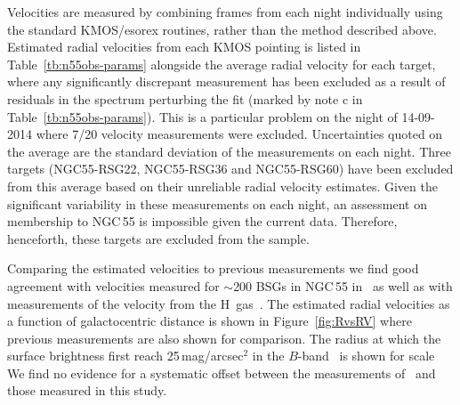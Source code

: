 Velocities are measured by combining frames from each night individually using the standard KMOS/esorex routines, rather than the method described above.
Estimated radial velocities from each KMOS pointing is listed in Table~\ref{tb:n55obs-params} alongside the average radial velocity for each target, where any significantly discrepant measurement has been excluded as a result of residuals in the spectrum perturbing the fit (marked by note c in Table~\ref{tb:n55obs-params}).
This is a particular problem on the night of 14-09-2014 where 7/20 velocity measurements were excluded.
Uncertainties quoted on the average are the standard deviation of the measurements on each night.
Three targets (NGC55-RSG22, NGC55-RSG36 and NGC55-RSG60) have been excluded from this average based on their unreliable radial velocity estimates.
Given the significant variability in these measurements on each night, an assessment on membership to NGC\,55 is impossible given the current data.
Therefore, henceforth, these targets are excluded from the sample.

Comparing the estimated velocities to previous measurements we find good agreement with velocities measured for $\sim$200 BSGs in NGC\,55 in~\citep{2008A&A...485...41C} as well as with measurements of the velocity from the H\,\1 gas~\citep{1991AJ....101..447P}.
The estimated radial velocities as a function of galactocentric distance is shown in Figure~\ref{fig:RvsRV} where previous measurements are also shown for comparison.
The radius at which the surface brightness first reach 25\,mag/arcsec$^2$ in the $B$-band~\citep[R$_{25}$ e.g.][]{2015eaci.book.....S} is shown for scale~\citep[$R_{25}$~=~16.2\,$\pm$\,0.4\,arcmin][]{1991rc3..book.....D}
We find no evidence for a systematic offset between the measurements of~\cite{2008A&A...485...41C} and those measured in this study.

